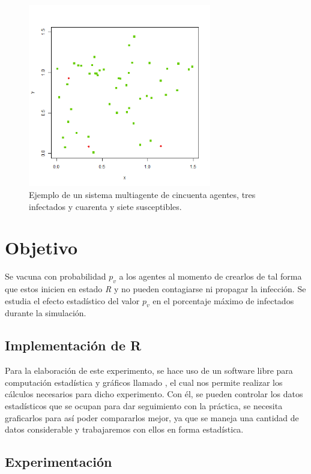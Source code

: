 \documentclass{article}
\begin{document}
\begin{figure}[h!]
\centering\includegraphics[width=80mm]{multiagente.png}
\caption{Ejemplo de un sistema multiagente de cincuenta agentes,  tres infectados y cuarenta y siete susceptibles.}
\label{fig:multiagente}
\end{figure}

\section{Objetivo}
Se vacuna con probabilidad $p_v$ a los agentes al momento de crearlos de tal forma que estos inicien en estado \textit{R} y no pueden contagiarse ni propagar la infecci\'on. Se estudia el efecto estad\'istico del valor $p_v$ en el porcentaje m\'aximo de infectados durante la simulaci\'on.

\newpage

\subsection{Implementaci\'on de R}
Para la elaboraci\'on de este experimento, se hace uso de un software libre para computaci\'on estad\'istica y gr\'aficos llamado \citet{R}, el cual nos permite realizar los c\'alculos necesarios para dicho experimento. Con \'el, se pueden controlar los datos estad\'isticos que se ocupan para dar seguimiento con la pr\'actica, se necesita graficarlos para as\'i poder compararlos mejor, ya que se maneja una cantidad de datos considerable y trabajaremos con ellos en forma estad\'istica.

\subsection{Experimentaci\'on}
\end{document}

